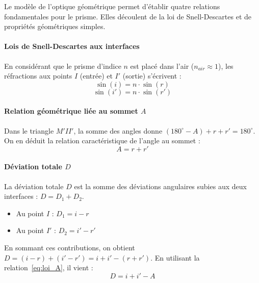 Le modèle de l'optique géométrique permet d'établir quatre relations fondamentales pour le prisme. Elles découlent de la loi de Snell-Descartes et de propriétés géométriques simples.

\paragraph{Lois de Snell-Descartes aux interfaces}
En considérant que le prisme d'indice $n$ est placé dans l'air ($n_{air} \approx 1$), les réfractions aux points $I$ (entrée) et $I'$ (sortie) s'écrivent :
\begin{equation}
    \sin(i) = n \cdot \sin(r)
\end{equation}
\begin{equation}
    \sin(i') = n \cdot \sin(r')
\end{equation}

\paragraph{Relation géométrique liée au sommet $A$}
Dans le triangle $M'II'$, la somme des angles donne $(180^{\circ} - A) + r + r' = 180^{\circ}$. On en déduit la relation caractéristique de l'angle au sommet :
\begin{equation}
    A = r + r'
    \label{eq:loi_A}
\end{equation}

\paragraph{Déviation totale $D$}
La déviation totale $D$ est la somme des déviations angulaires subies aux deux interfaces : $D = D_1 + D_2$. 
\begin{itemize}
    \item Au point $I$ : $D_1 = i - r$
    \item Au point $I'$ : $D_2 = i' - r'$
\end{itemize}
En sommant ces contributions, on obtient $D = (i - r) + (i' - r') = i + i' - (r + r')$. En utilisant la relation~\eqref{eq:loi_A}, il vient :
\begin{equation}
    D = i + i' - A
\end{equation}